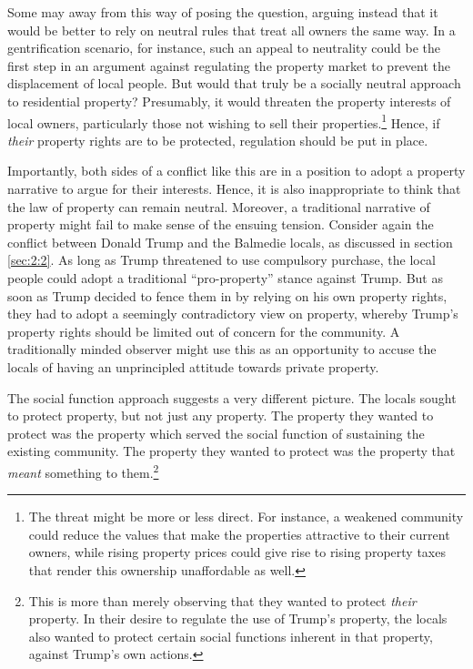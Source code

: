 Some may  away from this way of posing the question,  arguing instead that it would be better to rely on neutral rules that treat all owners the same way. In a gentrification scenario, for instance, such an appeal to neutrality could be the first step in an argument against regulating the property market to prevent the displacement of local people. But would that truly be a socially neutral approach to residential property? Presumably, it would threaten the property interests of local owners, particularly those not wishing to sell their properties.\footnote{The threat might be more or less direct. For instance, a weakened community could reduce the values that make the properties attractive to their current owners, while rising property prices could give rise to rising property taxes that render this ownership unaffordable as well.} Hence, if {\it their} property rights are to be protected, regulation should be put in place.

Importantly, both sides of a conflict like this are in a position to adopt a property narrative to argue for their interests. Hence, it is also inappropriate to think that the law of property can remain neutral. Moreover, a traditional narrative of property might fail to make sense of the ensuing tension. Consider again the conflict between Donald Trump and the Balmedie locals, as discussed in section \ref{sec:2:2}. As long as Trump threatened to use compulsory purchase, the local people could adopt a traditional ``pro-property'' stance against Trump. But as soon as Trump decided to fence them in by relying on his own property rights, they had to adopt a seemingly contradictory view on property, whereby Trump's property rights should be limited out of concern for the community. A traditionally minded observer might use this as an opportunity to accuse the locals of having an unprincipled attitude towards private property. 

The social function approach suggests a very different picture. The locals sought to protect property, but not just any property. The property they wanted to protect was the property which served the social function of sustaining the existing community. The property they wanted to protect was the property that {\it meant} something to them.\footnote{This is more than merely observing that they wanted to protect {\it their} property. In their desire to regulate the use of Trump's property, the locals also wanted to protect certain social functions inherent in that property, against Trump's own actions.} 


